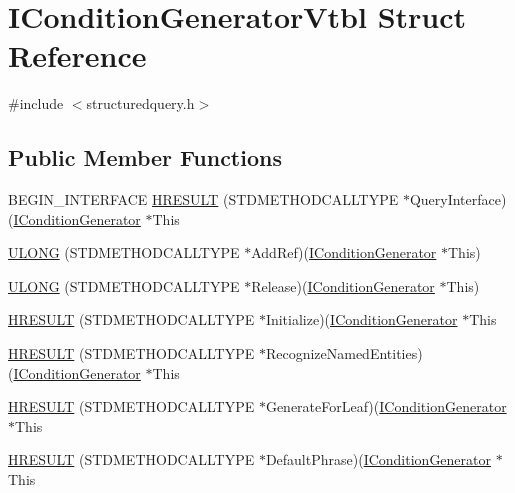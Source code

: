 \hypertarget{struct_i_condition_generator_vtbl}{}\section{I\+Condition\+Generator\+Vtbl Struct Reference}
\label{struct_i_condition_generator_vtbl}


{\ttfamily \#include $<$structuredquery.\+h$>$}

\subsection*{Public Member Functions}
\begin{DoxyCompactItemize}
\item 
B\+E\+G\+I\+N\+\_\+\+I\+N\+T\+E\+R\+F\+A\+CE \hyperlink{struct_i_condition_generator_vtbl_ae25fb4012981c9776b23dc952a3642b5}{H\+R\+E\+S\+U\+LT} (S\+T\+D\+M\+E\+T\+H\+O\+D\+C\+A\+L\+L\+T\+Y\+PE $\ast$Query\+Interface)(\hyperlink{structuredquery_8h_a347ef7c256ea80cd4ac781286d28bb2c}{I\+Condition\+Generator} $\ast$This
\item 
\hyperlink{struct_i_condition_generator_vtbl_aceb6458e61ff1bb1b40142adea4cc4e8}{U\+L\+O\+NG} (S\+T\+D\+M\+E\+T\+H\+O\+D\+C\+A\+L\+L\+T\+Y\+PE $\ast$Add\+Ref)(\hyperlink{structuredquery_8h_a347ef7c256ea80cd4ac781286d28bb2c}{I\+Condition\+Generator} $\ast$This)
\item 
\hyperlink{struct_i_condition_generator_vtbl_afca681c4ee121bcbec7624b72e4c4a89}{U\+L\+O\+NG} (S\+T\+D\+M\+E\+T\+H\+O\+D\+C\+A\+L\+L\+T\+Y\+PE $\ast$Release)(\hyperlink{structuredquery_8h_a347ef7c256ea80cd4ac781286d28bb2c}{I\+Condition\+Generator} $\ast$This)
\item 
\hyperlink{struct_i_condition_generator_vtbl_a8b406ee45ac1f2c6d738083ed54405b8}{H\+R\+E\+S\+U\+LT} (S\+T\+D\+M\+E\+T\+H\+O\+D\+C\+A\+L\+L\+T\+Y\+PE $\ast$Initialize)(\hyperlink{structuredquery_8h_a347ef7c256ea80cd4ac781286d28bb2c}{I\+Condition\+Generator} $\ast$This
\item 
\hyperlink{struct_i_condition_generator_vtbl_a8f422d63a39a560951558717f41f3f65}{H\+R\+E\+S\+U\+LT} (S\+T\+D\+M\+E\+T\+H\+O\+D\+C\+A\+L\+L\+T\+Y\+PE $\ast$Recognize\+Named\+Entities)(\hyperlink{structuredquery_8h_a347ef7c256ea80cd4ac781286d28bb2c}{I\+Condition\+Generator} $\ast$This
\item 
\hyperlink{struct_i_condition_generator_vtbl_a82677c459c68a5f1fcfb2abfc495a621}{H\+R\+E\+S\+U\+LT} (S\+T\+D\+M\+E\+T\+H\+O\+D\+C\+A\+L\+L\+T\+Y\+PE $\ast$Generate\+For\+Leaf)(\hyperlink{structuredquery_8h_a347ef7c256ea80cd4ac781286d28bb2c}{I\+Condition\+Generator} $\ast$This
\item 
\hyperlink{struct_i_condition_generator_vtbl_a1d2909ce411a22237a31dda0c595524f}{H\+R\+E\+S\+U\+LT} (S\+T\+D\+M\+E\+T\+H\+O\+D\+C\+A\+L\+L\+T\+Y\+PE $\ast$Default\+Phrase)(\hyperlink{structuredquery_8h_a347ef7c256ea80cd4ac781286d28bb2c}{I\+Condition\+Generator} $\ast$This
\end{DoxyCompactItemize}
